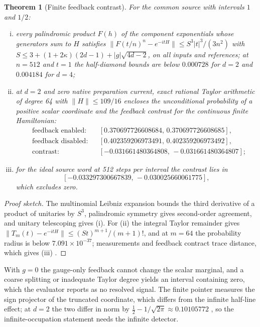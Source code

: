 \documentclass[11pt]{article}
\newtheorem{theorem}{Theorem}[section]
\theoremstyle{definition}
\theoremstyle{remark}
\theoremstyle{plain}
\begin{document}
\begin{theorem}[Finite feedback contrast]
\label{thm:finite-contrast}
For the common source with intervals $1$ and $1/2$:
\begin{enumerate}[(i)]
\item every palindromic product $F(h)$ of the component exponentials whose
generators sum to $H$ satisfies
$\lVert F(t/n)^n-e^{-itH}\rVert\le S^3\lvert t\rvert^3/(3n^2)$ with
$S\le3+(1+2\kappa)(2d-1)+\lvert g\rvert\sqrt{4d-2}$, on all inputs and
references; at $n=512$ and $t=1$ the half-diamond bounds are below
$0.000728$ for $d=2$ and $0.004184$ for $d=4$;
\item at $d=2$ and zero native preparation current, exact rational Taylor
arithmetic of degree 64 with $\lVert H\rVert\le109/16$ encloses the
unconditional probability of a positive scalar coordinate and the feedback
contrast for the continuous finite Hamiltonian:
\[
\begin{aligned}
&\text{feedback enabled:} && [0.370697726608684,\,0.370697726608685],\\
&\text{feedback disabled:} && [0.402359206973491,\,0.402359206973492],\\
&\text{contrast:} && [-0.031661480364808,\,-0.031661480364807];
\end{aligned}
\]
\item for the ideal source word at 512 steps per interval the contrast lies in
\[
[-0.033297300667839,\,-0.030025660061775],
\]
which excludes zero.
\end{enumerate}
\end{theorem}

\begin{proof}[Proof sketch]
The multinomial Leibniz expansion bounds the third derivative of a product of
unitaries by $S^3$, palindromic symmetry gives second-order agreement, and
unitary telescoping gives (i). For (ii) the integral Taylor remainder gives
$\lVert T_m(t)-e^{-itH}\rVert\le(St)^{m+1}/(m+1)!$, and at $m=64$ the
probability radius is below $7.091\times10^{-37}$; measurements and feedback
contract trace distance, which gives (iii) \cite{csDERIV}.
\end{proof}

With $g=0$ the gauge-only feedback cannot change the scalar marginal, and a
coarse splitting or inadequate Taylor degree yields an interval containing
zero, which the evaluator reports as no resolved signal. The finite pointer
measures the sign projector of the truncated coordinate, which differs from
the infinite half-line effect; at $d=2$ the two differ in norm by
$\frac12-1/\sqrt{2\pi}\approx0.10105772$ \cite{csREAD}, so the
infinite-occupation statement needs the infinite detector.
\end{document}
